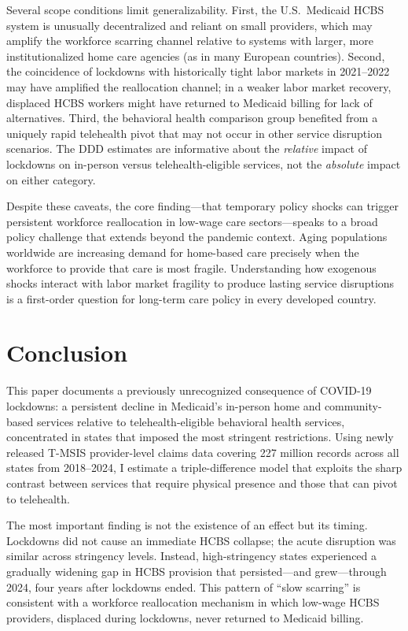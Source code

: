 \documentclass[12pt]{article}
\begin{document}
Several scope conditions limit generalizability. First, the U.S.\ Medicaid HCBS system is unusually decentralized and reliant on small providers, which may amplify the workforce scarring channel relative to systems with larger, more institutionalized home care agencies (as in many European countries). Second, the coincidence of lockdowns with historically tight labor markets in 2021--2022 may have amplified the reallocation channel; in a weaker labor market recovery, displaced HCBS workers might have returned to Medicaid billing for lack of alternatives. Third, the behavioral health comparison group benefited from a uniquely rapid telehealth pivot that may not occur in other service disruption scenarios. The DDD estimates are informative about the \textit{relative} impact of lockdowns on in-person versus telehealth-eligible services, not the \textit{absolute} impact on either category.

Despite these caveats, the core finding---that temporary policy shocks can trigger persistent workforce reallocation in low-wage care sectors---speaks to a broad policy challenge that extends beyond the pandemic context. Aging populations worldwide are increasing demand for home-based care precisely when the workforce to provide that care is most fragile. Understanding how exogenous shocks interact with labor market fragility to produce lasting service disruptions is a first-order question for long-term care policy in every developed country.


\section{Conclusion}

This paper documents a previously unrecognized consequence of COVID-19 lockdowns: a persistent decline in Medicaid's in-person home and community-based services relative to telehealth-eligible behavioral health services, concentrated in states that imposed the most stringent restrictions. Using newly released T-MSIS provider-level claims data covering 227 million records across all states from 2018--2024, I estimate a triple-difference model that exploits the sharp contrast between services that require physical presence and those that can pivot to telehealth.

The most important finding is not the existence of an effect but its timing. Lockdowns did not cause an immediate HCBS collapse; the acute disruption was similar across stringency levels. Instead, high-stringency states experienced a gradually widening gap in HCBS provision that persisted---and grew---through 2024, four years after lockdowns ended. This pattern of ``slow scarring'' is consistent with a workforce reallocation mechanism in which low-wage HCBS providers, displaced during lockdowns, never returned to Medicaid billing.
\end{document}
